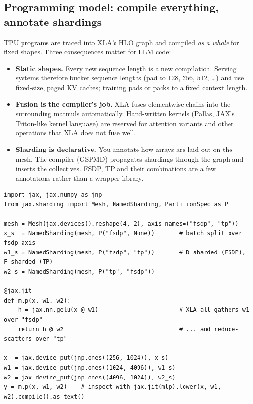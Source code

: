 \subsection{Programming model: compile everything, annotate shardings}

TPU programs are traced into XLA's HLO graph and compiled \emph{as a whole} for fixed shapes. Three
consequences matter for LLM code:
\begin{itemize}
  \item \textbf{Static shapes.} Every new sequence length is a new compilation. Serving systems
    therefore bucket sequence lengths (pad to 128, 256, 512, \dots) and use fixed-size, paged KV
    caches; training pads or packs to a fixed context length.
  \item \textbf{Fusion is the compiler's job.} XLA fuses elementwise chains into the surrounding matmuls
    automatically. Hand-written kernels (Pallas, JAX's Triton-like kernel language) are reserved for
    attention variants and other operations that XLA does not fuse well.
  \item \textbf{Sharding is declarative.} You annotate how arrays are laid out on the mesh. The
    compiler (GSPMD) propagates shardings through the graph and inserts the collectives.
    FSDP, TP and their combinations are a few annotations rather than a wrapper library.
\end{itemize}

\begin{lstlisting}[caption={FSDP $\times$ TP for one MLP in JAX: shardings declared, collectives inferred (illustrative; not run in this environment).},label={lst:accel:jax}]
import jax, jax.numpy as jnp
from jax.sharding import Mesh, NamedSharding, PartitionSpec as P

mesh = Mesh(jax.devices().reshape(4, 2), axis_names=("fsdp", "tp"))
x_s  = NamedSharding(mesh, P("fsdp", None))       # batch split over fsdp axis
w1_s = NamedSharding(mesh, P("fsdp", "tp"))       # D sharded (FSDP), F sharded (TP)
w2_s = NamedSharding(mesh, P("tp", "fsdp"))

@jax.jit
def mlp(x, w1, w2):
    h = jax.nn.gelu(x @ w1)                       # XLA all-gathers w1 over "fsdp"
    return h @ w2                                 # ... and reduce-scatters over "tp"

x  = jax.device_put(jnp.ones((256, 1024)), x_s)
w1 = jax.device_put(jnp.ones((1024, 4096)), w1_s)
w2 = jax.device_put(jnp.ones((4096, 1024)), w2_s)
y = mlp(x, w1, w2)    # inspect with jax.jit(mlp).lower(x, w1, w2).compile().as_text()
\end{lstlisting}

